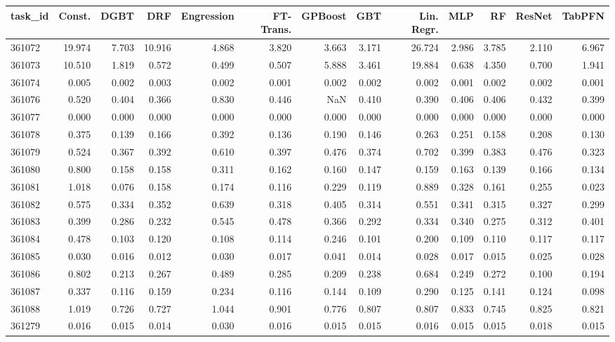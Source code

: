 \begin{tabular}{lrrrrrrrrrrrr}
\toprule
task\_id & Const. & DGBT & DRF & Engression & FT-Trans. & GPBoost & GBT & Lin. Regr. & MLP & RF & ResNet & TabPFN \\
\midrule
361072 & 19.974 & 7.703 & 10.916 & 4.868 & 3.820 & 3.663 & 3.171 & 26.724 & 2.986 & 3.785 & 2.110 & 6.967 \\
361073 & 10.510 & 1.819 & 0.572 & 0.499 & 0.507 & 5.888 & 3.461 & 19.884 & 0.638 & 4.350 & 0.700 & 1.941 \\
361074 & 0.005 & 0.002 & 0.003 & 0.002 & 0.001 & 0.002 & 0.002 & 0.002 & 0.001 & 0.002 & 0.002 & 0.001 \\
361076 & 0.520 & 0.404 & 0.366 & 0.830 & 0.446 & NaN & 0.410 & 0.390 & 0.406 & 0.406 & 0.432 & 0.399 \\
361077 & 0.000 & 0.000 & 0.000 & 0.000 & 0.000 & 0.000 & 0.000 & 0.000 & 0.000 & 0.000 & 0.000 & 0.000 \\
361078 & 0.375 & 0.139 & 0.166 & 0.392 & 0.136 & 0.190 & 0.146 & 0.263 & 0.251 & 0.158 & 0.208 & 0.130 \\
361079 & 0.524 & 0.367 & 0.392 & 0.610 & 0.397 & 0.476 & 0.374 & 0.702 & 0.399 & 0.383 & 0.476 & 0.323 \\
361080 & 0.800 & 0.158 & 0.158 & 0.311 & 0.162 & 0.160 & 0.147 & 0.159 & 0.163 & 0.139 & 0.166 & 0.134 \\
361081 & 1.018 & 0.076 & 0.158 & 0.174 & 0.116 & 0.229 & 0.119 & 0.889 & 0.328 & 0.161 & 0.255 & 0.023 \\
361082 & 0.575 & 0.334 & 0.352 & 0.639 & 0.318 & 0.405 & 0.314 & 0.551 & 0.341 & 0.315 & 0.327 & 0.299 \\
361083 & 0.399 & 0.286 & 0.232 & 0.545 & 0.478 & 0.366 & 0.292 & 0.334 & 0.340 & 0.275 & 0.312 & 0.401 \\
361084 & 0.478 & 0.103 & 0.120 & 0.108 & 0.114 & 0.246 & 0.101 & 0.200 & 0.109 & 0.110 & 0.117 & 0.117 \\
361085 & 0.030 & 0.016 & 0.012 & 0.030 & 0.017 & 0.041 & 0.014 & 0.028 & 0.017 & 0.015 & 0.025 & 0.028 \\
361086 & 0.802 & 0.213 & 0.267 & 0.489 & 0.285 & 0.209 & 0.238 & 0.684 & 0.249 & 0.272 & 0.100 & 0.194 \\
361087 & 0.337 & 0.116 & 0.159 & 0.234 & 0.116 & 0.144 & 0.109 & 0.290 & 0.125 & 0.141 & 0.124 & 0.098 \\
361088 & 1.019 & 0.726 & 0.727 & 1.044 & 0.901 & 0.776 & 0.807 & 0.807 & 0.833 & 0.745 & 0.825 & 0.821 \\
361279 & 0.016 & 0.015 & 0.014 & 0.030 & 0.016 & 0.015 & 0.015 & 0.016 & 0.015 & 0.015 & 0.018 & 0.015 \\

\end{tabular}
